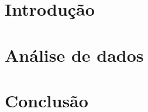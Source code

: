 \documentclass[11pt]{article}
\begin{document}


\newpage{}
\tableofcontents{}
\newpage{}

\section{Introdução}


\section{Análise de dados}






\section{Conclusão}

\end{document}
